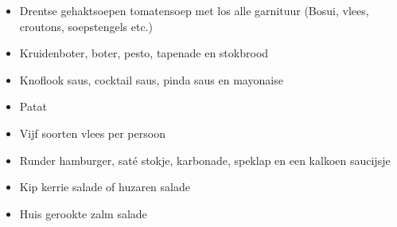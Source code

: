 \begin{itemize}
\item	Drentse gehaktsoepen tomatensoep met los alle garnituur (Bosui, vlees, croutons, soepstengels etc.)
\item	Kruidenboter, boter, pesto, tapenade en stokbrood
\item	Knoflook saus, cocktail saus, pinda saus en mayonaise
\item	Patat
\item	Vijf soorten vlees per persoon
\item	Runder hamburger, saté stokje, karbonade, speklap en een kalkoen saucijsje
\item	Kip kerrie salade of huzaren salade
\item	Huis gerookte zalm salade
\end{itemize}
